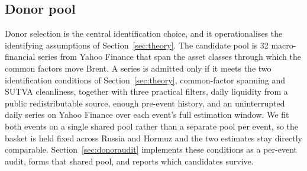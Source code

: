 \subsection{Donor pool}
Donor selection is the central identification choice, and it operationalises the
identifying assumptions of Section~\ref{sec:theory}. The candidate pool is 32
macro-financial series from Yahoo Finance that span the asset classes through which the
common factors move Brent. A series is admitted only if it meets the two identification
conditions of Section~\ref{sec:theory}, common-factor spanning and SUTVA cleanliness,
together with three practical filters, daily liquidity from a public redistributable
source, enough pre-event history, and an uninterrupted daily series on Yahoo Finance over
each event's full estimation window. We fit both events on a single shared pool rather than a
separate pool per event, so the basket is held fixed across Russia and Hormuz and the two
estimates stay directly comparable. Section~\ref{sec:donoraudit} implements these
conditions as a per-event audit, forms that shared pool, and reports which candidates
survive.


